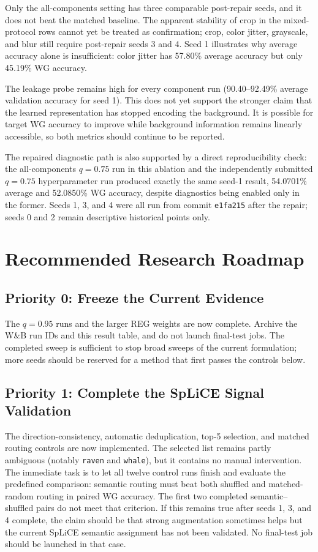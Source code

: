 \documentclass[11pt,a4paper]{article}
\begin{document}
Only the all-components setting has three comparable post-repair seeds, and it
does not beat the matched baseline. The apparent stability of crop in the
mixed-protocol rows cannot yet be treated as confirmation; crop, color jitter,
grayscale, and blur still require post-repair seeds 3 and 4. Seed 1 illustrates
why average accuracy alone is insufficient: color jitter has 57.80\% average
accuracy but only 45.19\% WG accuracy.

The leakage probe remains high for every component run (90.40--92.49\%
average validation accuracy for seed 1). This does not yet support the
stronger claim that the learned representation has stopped encoding the
background. It is possible for target WG accuracy to improve while background
information remains linearly accessible, so both metrics should continue to be
reported.

The repaired diagnostic path is also supported by a direct reproducibility
check: the all-components $q=0.75$ run in this ablation and the independently
submitted $q=0.75$ hyperparameter run produced exactly the same seed-1 result,
54.0701\% average and 52.0850\% WG accuracy, despite diagnostics being enabled
only in the former. Seeds 1, 3, and 4 were all run from commit
\texttt{e1fa215} after the repair; seeds 0 and 2 remain descriptive historical
points only.

\FloatBarrier

\section{Recommended Research Roadmap}

\subsection{Priority 0: Freeze the Current Evidence}

The $q=0.95$ runs and the larger REG weights are now complete. Archive the W\&B
run IDs and this result table, and do not launch final-test jobs. The completed
sweep is sufficient to stop broad sweeps of the current formulation; more seeds
should be reserved for a method that first passes the controls below.

\subsection{Priority 1: Complete the SpLiCE Signal Validation}

The direction-consistency, automatic deduplication, top-5 selection, and
matched routing controls are now implemented. The selected list remains
partly ambiguous (notably \texttt{raven} and \texttt{whale}), but it contains
no manual intervention. The immediate task is to let all twelve control runs
finish and evaluate the predefined comparison: semantic routing must beat both
shuffled and matched-random routing in paired WG accuracy. The first two
completed semantic--shuffled pairs do not meet that criterion. If this remains
true after seeds 1, 3, and 4 complete, the claim should be that strong
augmentation sometimes helps but the current SpLiCE semantic assignment has
not been validated. No final-test job should be launched in that case.
\end{document}

